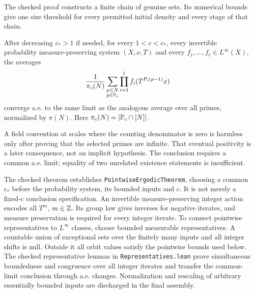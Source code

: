 The checked proof constructs a finite chain of genuine sets. Its numerical bounds give one size threshold for every permitted initial density and every stage of that chain.
\fi

\begin{theorem}\label{t:pointwise}
\leanok
After decreasing $c_*>1$ if needed, for every $1<c<c_*$, every invertible probability measure-preserving system $(X,\nu,T)$ and every $f_1,\ldots,f_\ell\in L^\infty(X)$, the averages
\[
 \frac1{\pi_c(N)}\sum_{\substack{p\leq N\\p\in\mathbb P_c}}
 \prod_{i=1}^{\ell}f_i(T^{P_i(p-1)}x)
\]
converge a.e. to the same limit as the analogous average over all primes, normalized by $\pi(N)$. Here $\pi_c(N)=|\mathbb P_c\cap[N]|$.
\end{theorem}
\ifDetailed
A field convention at scales where the counting denominator is zero is harmless only after proving that the selected primes are infinite. That eventual positivity is a later consequence, not an implicit hypothesis. The conclusion requires a common a.e. limit; equality of two unrelated existence statements is insufficient.

The checked theorem establishes \texttt{PointwiseErgodicTheorem}, choosing a common $c_*$ before the probability system, its bounded inputs and $c$. It is not merely a fixed-$c$ conclusion specification. An invertible measure-preserving integer action encodes all $T^m$, $m\in\mathbb Z$. Its group law gives inverses for negative iterates, and measure preservation is required for every integer iterate. To connect pointwise representatives to $L^\infty$ classes, choose bounded measurable representatives. A countable union of exceptional sets over the finitely many inputs and all integer shifts is null. Outside it all orbit values satisfy the pointwise bounds used below. The checked representative lemmas in \texttt{Representatives.lean} prove simultaneous boundedness and congruence over all integer iterates and transfer the common-limit conclusion through a.e. changes. Normalization and rescaling of arbitrary essentially bounded inputs are discharged in the final assembly.
\fi

